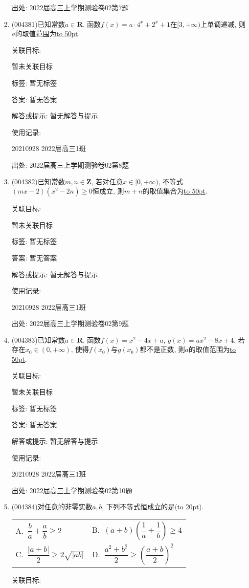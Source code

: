 \documentclass[10pt,a4paper]{article}
\newcommand{\blank}[1]{\underline{\hbox to #1pt{}}}
\newcommand{\bracket}[1]{(\hbox to #1pt{})}
\newcommand{\twoch}[4]{\par\begin{tabular}{p{.46\textwidth}p{.46\textwidth}}
A.~#1& B.~#2\\
C.~#3& D.~#4
\end{tabular}}
\begin{document}
\begin{enumerate}[1.]
出处: 2022届高三上学期测验卷02第7题
\item { (004381)}已知常数$a\in \mathbf{R}$, 函数$f(x)=a\cdot 4^x+2^x+1$在$[3,+\infty)$上单调递减, 则$a$的取值范围为\blank{50}.


关联目标:

暂未关联目标



标签: 暂无标签

答案: 暂无答案

解答或提示: 暂无解答与提示

使用记录:

20210928	2022届高三1班	


出处: 2022届高三上学期测验卷02第8题
\item { (004382)}已知常数$m,n\in \mathbf{Z}$, 若对任意$x\in [0,+\infty)$, 不等式$(mx-2)(x^2-2n)\ge 0$恒成立, 则$m+n$的取值集合为\blank{50}.


关联目标:

暂未关联目标



标签: 暂无标签

答案: 暂无答案

解答或提示: 暂无解答与提示

使用记录:

20210928	2022届高三1班	


出处: 2022届高三上学期测验卷02第9题
\item { (004383)}已知常数$a\in \mathbf{R}$, 函数$f(x)=x^2-4x+a$, $g(x)=ax^2-8x+4$. 若存在$x_0\in (0,+\infty)$, 使得$f(x_0)$与$g(x_0)$都不是正数, 则$a$的取值范围为\blank{50}.


关联目标:

暂未关联目标



标签: 暂无标签

答案: 暂无答案

解答或提示: 暂无解答与提示

使用记录:

20210928	2022届高三1班	


出处: 2022届高三上学期测验卷02第10题
\item { (004384)}对任意的非零实数$a,b$, 下列不等式恒成立的是\bracket{20}.
\twoch{$\dfrac ba+\dfrac ab\ge 2$}{$(a+b)(\dfrac 1a+\dfrac 1b)\ge 4$}{$\dfrac{|a+b|}2\ge 2\sqrt{|ab|}$}{$\dfrac{a^2+b^2}{2}\ge (\dfrac{a+b}2)^2$}


关联目标:


\end{enumerate}
\end{document}
